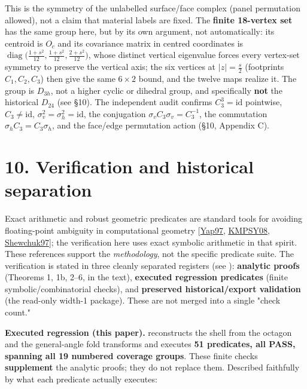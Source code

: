 \documentclass[
  11pt,
  a4paper,
]{article}
\begin{document}
This is the symmetry of the unlabelled surface/face complex (panel permutation allowed), not a claim that material labels are fixed. The \textbf{finite 18-vertex set} has the same group here, but by its own argument, not automatically: its centroid is \(O_c\) and its covariance matrix in centred coordinates is \(\operatorname{diag}\bigl(\tfrac{1+s^2}{12},\tfrac{1+s^2}{12},\tfrac{2+s^2}{12}\bigr)\), whose distinct vertical eigenvalue forces every vertex-set symmetry to preserve the vertical axis; the six vertices at \(|z|=\tfrac{s}{2}\) (footprints \(C_1,C_2,C_3\)) then give the same \(6\times2\) bound, and the twelve maps realize it. The group is \(D_{3h}\), not a higher cyclic or dihedral group, and specifically \textbf{not} the historical \(D_{24}\) (see §10). The independent audit confirms \(C_3^3=\mathrm{id}\) pointwise, \(C_3\ne\mathrm{id}\), \(\sigma_v^2=\sigma_h^2=\mathrm{id}\), the conjugation \(\sigma_vC_3\sigma_v=C_3^{-1}\), the commutation \(\sigma_hC_3=C_3\sigma_h\), and the face/edge permutation action (§10, Appendix C).

\section{10. Verification and historical separation}\label{verification-and-historical-separation}

Exact arithmetic and robust geometric predicates are standard tools for avoiding floating-point ambiguity in computational geometry {[}\hyperlink{ref-Yap97}{Yap97}, \hyperlink{ref-KMPSY08}{KMPSY08}, \hyperlink{ref-Shewchuk97}{Shewchuk97}{]}; the verification here uses exact symbolic arithmetic in that spirit. These references support the \emph{methodology}, not the specific predicate suite. The verification is stated in three cleanly separated registers (see ): \textbf{analytic proofs} (Theorems 1, 1b, 2--6, in the text), \textbf{executed regression predicates} (finite symbolic/combinatorial checks), and \textbf{preserved historical/export validation} (the read-only width-1 package). These are not merged into a single "check count."

\textbf{Executed regression (this paper).}  reconstructs the shell from the octagon and the general-angle fold transforms and executes \textbf{51 predicates, all PASS, spanning all 19 numbered coverage groups}. These finite checks \textbf{supplement} the analytic proofs; they do not replace them. Described faithfully by what each predicate actually executes:
\end{document}

